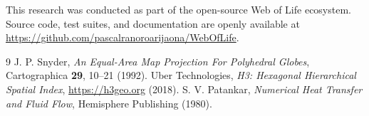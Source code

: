 \documentclass[twocolumn,10pt,amsmath,amssymb,aps,prl]{revtex4-2}
\begin{document}
\begin{acknowledgments}
This research was conducted as part of the open-source Web of Life ecosystem. Source code, test suites, and documentation are openly available at \url{https://github.com/pascalranoroarijaona/WebOfLife}.
\end{acknowledgments}

\begin{thebibliography}{9}
 J. P. Snyder, \emph{An Equal-Area Map Projection For Polyhedral Globes}, Cartographica \textbf{29}, 10--21 (1992).
 Uber Technologies, \emph{H3: Hexagonal Hierarchical Spatial Index}, \url{https://h3geo.org} (2018).
 S. V. Patankar, \emph{Numerical Heat Transfer and Fluid Flow}, Hemisphere Publishing (1980).
\end{thebibliography}
\end{document}
